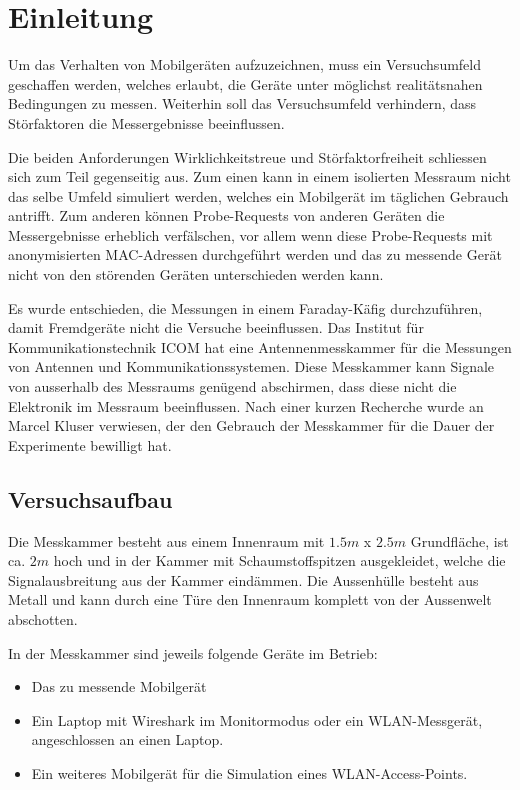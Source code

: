 \section{Einleitung}
Um das Verhalten von Mobilgeräten aufzuzeichnen, muss ein Versuchsumfeld 
geschaffen werden, welches erlaubt, die Geräte unter möglichst realitätsnahen 
Bedingungen zu messen.
Weiterhin soll das Versuchsumfeld verhindern, dass Störfaktoren die Messergebnisse 
beeinflussen.

Die beiden Anforderungen Wirklichkeitstreue und Störfaktorfreiheit schliessen
sich zum Teil gegenseitig aus.
Zum einen kann in einem isolierten Messraum nicht das selbe Umfeld simuliert 
werden, welches ein Mobilgerät im täglichen Gebrauch antrifft.
Zum anderen können Probe-Requests von anderen Geräten die Messergebnisse 
erheblich verfälschen, vor allem wenn diese Probe-Requests mit anonymisierten
MAC-Adressen durchgeführt werden und das zu messende Gerät nicht von den 
störenden Geräten unterschieden werden kann.

Es wurde entschieden, die Messungen in einem Faraday-Käfig 
durchzuführen, damit Fremdgeräte nicht die Versuche beeinflussen.
Das Institut für Kommunikationstechnik ICOM hat eine Antennenmesskammer 
für die Messungen von Antennen und Kommunikationssystemen.
Diese Messkammer kann Signale von ausserhalb des Messraums genügend abschirmen,
dass diese nicht die Elektronik im Messraum beeinflussen.
Nach einer kurzen Recherche wurde an Marcel Kluser verwiesen, 
der den Gebrauch der Messkammer für die Dauer der Experimente bewilligt hat.

\subsection{Versuchsaufbau}
Die Messkammer besteht aus einem Innenraum mit $1.5m$ x $2.5m$ Grundfläche, 
ist ca. $2m$ hoch und in der Kammer mit Schaumstoffspitzen ausgekleidet, 
welche die Signalausbreitung aus der Kammer eindämmen. 
Die Aussenhülle besteht aus Metall und kann durch eine Türe den Innenraum
komplett von der Aussenwelt abschotten.

In der Messkammer sind jeweils folgende Geräte im Betrieb:
\begin{itemize}
    \item Das zu messende Mobilgerät
    \item Ein Laptop mit Wireshark im Monitormodus oder ein WLAN-Messgerät, 
    angeschlossen an einen Laptop.
    \item Ein weiteres Mobilgerät für die Simulation eines WLAN-Access-Points.
\end{itemize}


